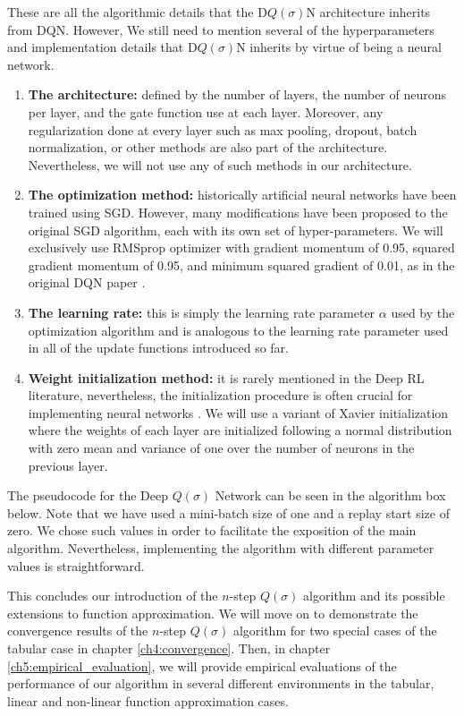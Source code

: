 These are all the algorithmic details that the D$Q(\sigma)$N architecture inherits from DQN.
However, We still need to mention several of the hyperparameters and implementation details that D$Q(\sigma)$N inherits by virtue of being a neural network.
%
\begin{enumerate}
\item \textbf{The architecture:} defined by the number of layers, the number of neurons per layer, and the gate function use at each layer. 
Moreover, any regularization done at every layer such as max pooling, dropout, batch normalization, or other methods \parencite{Goodfellow-et-al-2016} are also part of the architecture.
Nevertheless, we will not use any of such methods in our architecture.
\item \textbf{The optimization method:} historically artificial neural networks have been trained using SGD. 
However, many modifications have been proposed to the original SGD algorithm, each with its own set of hyper-parameters.
We will exclusively use RMSprop optimizer \parencite{Tieleman2012} with gradient momentum of 0.95, squared gradient momentum of 0.95, and minimum squared gradient of 0.01, as in the original DQN paper \parencite{mnih2015humanlevel}.
\item \textbf{The learning rate:} this is simply the learning rate parameter $\alpha$ used by the optimization algorithm and is analogous to the learning rate parameter used in all of the update functions introduced so far.
\item \textbf{Weight initialization method:} it is rarely mentioned in the Deep RL literature, nevertheless, the initialization procedure is often crucial for implementing neural networks \parencite{Goodfellow-et-al-2016}.
We will use a variant of Xavier initialization \parencite{Glorot10understandingthe} where the weights of each layer are initialized following a normal distribution with zero mean and variance of one over the number of neurons in the previous layer.
\end{enumerate}

The pseudocode for the Deep $Q(\sigma)$ Network can be seen in the algorithm box below. 
Note that we have used a mini-batch size of one and a replay start size of zero.
We chose such values in order to facilitate the exposition of the main algorithm.
Nevertheless, implementing the algorithm with different parameter values is straightforward.

This concludes our introduction of the $n$-step $Q(\sigma)$ algorithm and its possible extensions to function approximation.
We will move on to demonstrate the convergence results of the $n$-step $Q(\sigma)$ algorithm for two special cases of the tabular case in chapter \ref{ch4:convergence}.
Then, in chapter \ref{ch5:empirical_evaluation}, we will provide empirical evaluations of the performance of our algorithm in several different environments in the tabular, linear and non-linear function approximation cases.

